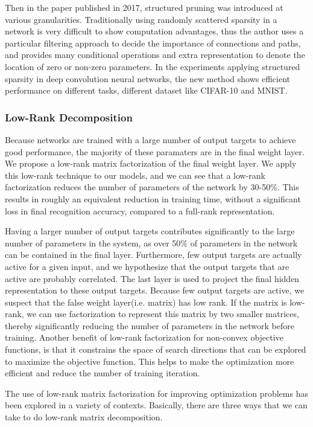 \documentclass[a4paper]{article}
\begin{document}
\par Then in the paper \cite{structuredprunning} published in 2017, structured pruning was introduced at various granularities. Traditionally using randomly scattered sparsity in a network is very difficult to show computation advantages, thus the author uses a particular filtering approach to decide the importance of connections and paths, and provides many conditional operations and extra representation to denote the location of zero or non-zero parameters. In the experiments applying structured sparsity in deep convolution neural networks, the new method shows efficient performance on different tasks, different dataset like CIFAR-10 and MNIST.

\subsubsection{Low-Rank Decomposition}
\par Because networks are trained with a large number of output targets to achieve good performance, the majority of these paramaters are in the final weight layer. We propose a low-rank matrix factorization of the final weight layer. We apply this low-rank technique to our models, and we can see that a low-rank factorization reduces the number of parameters of the network by 30-50\%. This results in roughly an equivalent reduction in training time, without a significant loss in final recognition accuracy, compared to a full-rank representation.
\par Having a larger number of output targets contributes significantly to the large number of parameters in the system, as over 50\% of parameters in the network can be contained in the final layer. Furthermore, few output targets are actually active for a given input, and we hypothesize that the output targets that are active are probably correlated. The last layer is used to project the final hidden representation to these output targets. Because few output targets are active, we suspect that the false weight layer(i.e. matrix) has low rank. If the matrix is low-rank, we can use factorization to represent this matrix by two smaller matrices, thereby significantly reducing the number of parameters in the network before training. Another benefit of low-rank factorization for non-convex objective functions, is that it constrains the space of search directions that can be explored to maximize the objective function. This helps to make the optimization more efficient and reduce the number of training iteration.
\par The use of low-rank matrix factorization for improving optimization problems has been explored in a variety of contexts. Basically, there are three ways that we can take to do low-rank matrix decomposition.
\end{document}
